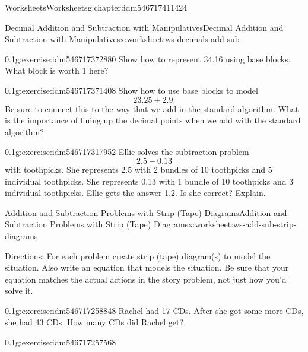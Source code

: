 \documentclass[twoside,11pt,]{book}
\begin{document}
\begin{chapterptx}{Worksheets}{}{Worksheets}{}{}{g:chapter:idm546717411424}
\begin{worksheet-section-numberless}{Decimal Addition and Subtraction with Manipulatives}{}{Decimal Addition and Subtraction with Manipulatives}{}{}{x:worksheet:ws-decimals-add-sub}
\begin{divisionexercise}{2}{}{0.1}{g:exercise:idm546717372880}%
Show how to represent 34.16 using base blocks.  What block is worth 1 here?%
\end{divisionexercise}%
\begin{divisionexercise}{3}{}{0.1}{g:exercise:idm546717371408}%
Show how to use base blocks to model%
\begin{equation*}
23.25+2.9\text{.}
\end{equation*}
Be sure to connect this to the way that we add in the standard algorithm.  What is the importance of lining up the decimal points when we add with the standard algorithm?%
\end{divisionexercise}%
\begin{divisionexercise}{4}{}{0.1}{g:exercise:idm546717317952}%
Ellie solves the subtraction problem%
\begin{equation*}
2.5-0.13
\end{equation*}
with toothpicks.  She represents 2.5 with 2 bundles of 10 toothpicks and 5 individual toothpicks.  She represents 0.13 with 1 bundle of 10 toothpicks and 3 individual toothpicks.  Ellie gets the answer 1.2.  Is she correct?  Explain.%
\end{divisionexercise}%
\end{worksheet-section-numberless}
\restoregeometry
%
%
\typeout{************************************************}
\typeout{************************************************}
%
\begin{worksheet-section-numberless}{Addition and Subtraction Problems with Strip (Tape) Diagrams}{}{Addition and Subtraction Problems with Strip (Tape) Diagrams}{}{}{x:worksheet:ws-add-sub-strip-diagrams}
\begin{introduction}{}%
Directions: For each problem create strip (tape) diagram(s) to model the situation.  Also write an equation that models the situation.  Be sure that your equation matches the actual actions in the story problem, not just how you’d solve it.%
\end{introduction}%
\begin{divisionexercise}{1}{}{0.1}{g:exercise:idm546717258848}%
Rachel had 17 CDs.  After she got some more CDs, she had 43 CDs.  How many CDs did Rachel get?%
\end{divisionexercise}%
\begin{divisionexercise}{2}{}{0.1}{g:exercise:idm546717257568}%

\end{divisionexercise}
\end{worksheet-section-numberless}
\end{chapterptx}
\end{document}
